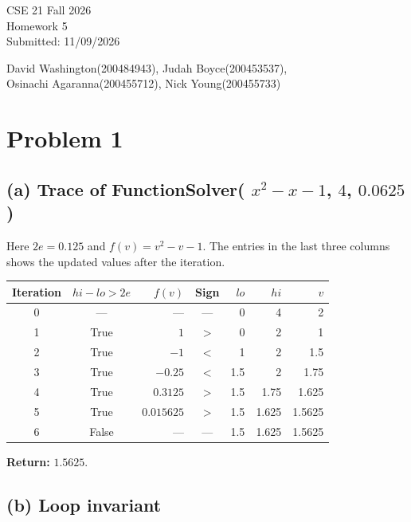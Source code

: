\documentclass[11pt]{article}
\begin{document}
\begin{flushright}
CSE 21 Fall 2026\\
Homework 5\\
Submitted: 11/09/2026
\end{flushright}

\begin{center}
David Washington(200484943), Judah Boyce(200453537),\\
Osinachi Agaranna(200455712), Nick Young(200455733)
\end{center}

\section*{Problem 1}

\subsection*{(a) Trace of FunctionSolver( $x^2-x-1$, $4$, $0.0625$)}

Here $2e=0.125$ and $f(v)= v^2-v-1$. The entries in the last three columns shows the updated values after the iteration. 

\begin{center}\small

\begin{tabular}{c c r c r r r}

\toprule

Iteration & $hi-lo>2e$ & $f(v)$ & Sign & $lo$ & $hi$ & $v$ \\

\midrule
0 & --- & --- & --- & 0 & 4 & 2 \\
1 & True & $1$ & $>$ & 0 & 2 & 1 \\
2 & True & $-1$ & $<$ & 1 & 2 & 1.5 \\
3 & True & $-0.25$ & $<$ & 1.5 & 2 & 1.75 \\
4 & True & $0.3125$ & $>$ & 1.5 & 1.75 & 1.625 \\
5 & True & $0.015625$ & $>$ & 1.5 & 1.625 & 1.5625 \\
6 & False & --- & --- & 1.5 & 1.625 & 1.5625 \\
\bottomrule
\end{tabular}
\end{center}

\noindent\textbf{Return:} $1.5625$. \par

\subsection*{(b) Loop invariant}
\end{document}
